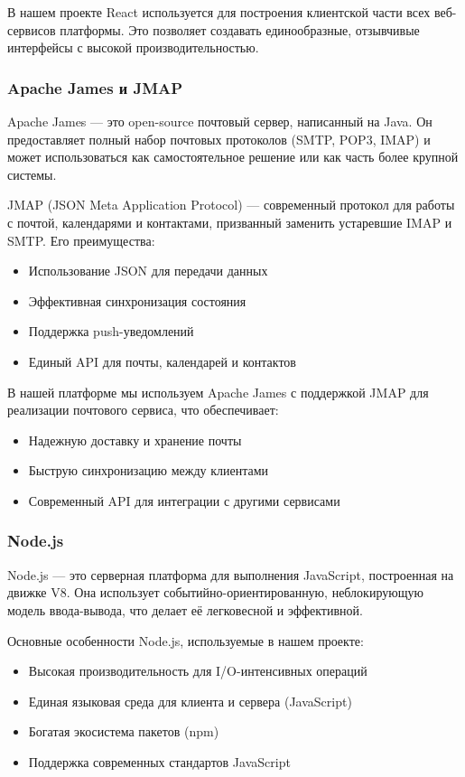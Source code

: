 В нашем проекте React используется для построения клиентской части всех веб-сервисов платформы. Это позволяет создавать единообразные, отзывчивые интерфейсы с высокой производительностью.

\subsubsection{Apache James и JMAP}
Apache James — это open-source почтовый сервер, написанный на Java. Он предоставляет полный набор почтовых протоколов (SMTP, POP3, IMAP) и может использоваться как самостоятельное решение или как часть более крупной системы.

JMAP (JSON Meta Application Protocol) — современный протокол для работы с почтой, календарями и контактами, призванный заменить устаревшие IMAP и SMTP. Его преимущества:
\begin{itemize}
\item Использование JSON для передачи данных
\item Эффективная синхронизация состояния
\item Поддержка push-уведомлений
\item Единый API для почты, календарей и контактов
\end{itemize}

В нашей платформе мы используем Apache James с поддержкой JMAP для реализации почтового сервиса, что обеспечивает:
\begin{itemize}
\item Надежную доставку и хранение почты
\item Быструю синхронизацию между клиентами
\item Современный API для интеграции с другими сервисами
\end{itemize}

\subsubsection{Node.js}
Node.js — это серверная платформа для выполнения JavaScript, построенная на движке V8. Она использует событийно-ориентированную, неблокирующую модель ввода-вывода, что делает её легковесной и эффективной.

Основные особенности Node.js, используемые в нашем проекте:
\begin{itemize}
\item Высокая производительность для I/O-интенсивных операций
\item Единая языковая среда для клиента и сервера (JavaScript)
\item Богатая экосистема пакетов (npm)
\item Поддержка современных стандартов JavaScript
\end{itemize}

